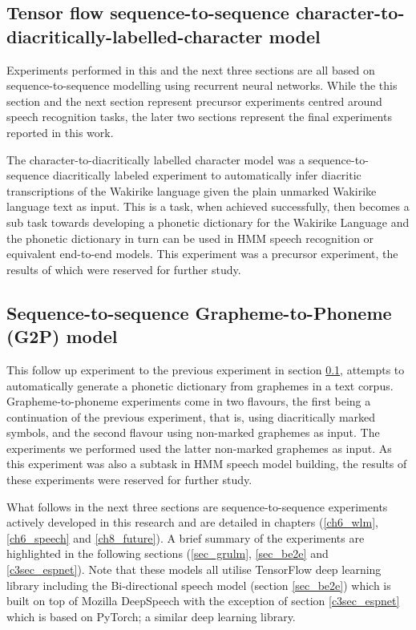 \subsection{Tensor flow sequence-to-sequence character-to-diacritically-labelled-character model}\label{sec_c2d}
Experiments performed in this and the next three sections are all based on sequence-to-sequence modelling using recurrent neural networks.  While the this section and the next section represent precursor experiments centred around speech recognition tasks, the later two sections represent the final experiments reported in this work.

The character-to-diacritically labelled character model was a sequence-to-sequence diacritically labeled experiment to automatically infer diacritic transcriptions of the Wakirike language given the plain unmarked Wakirike language text as input.  This is a task, when achieved successfully, then becomes a sub task towards developing a phonetic dictionary for the Wakirike Language and the phonetic dictionary in turn can be used in HMM speech recognition or equivalent  end-to-end models.  This experiment was a precursor experiment, the results of which were reserved for further study.

\subsection{Sequence-to-sequence Grapheme-to-Phoneme (G2P) model}\label{sec_c3_g2p}
This follow up experiment to the previous experiment in section \ref{sec_c2d},  attempts to automatically generate a phonetic dictionary from graphemes in a text corpus. Grapheme-to-phoneme experiments come in two flavours, the first being a continuation of the previous experiment, that is, using diacritically marked symbols, and the second flavour using non-marked graphemes as input.  The experiments we performed used the latter non-marked graphemes as input. As this experiment was also a subtask in HMM speech model building,  the results of these experiments were reserved for further study.

What follows in the next three sections are sequence-to-sequence experiments actively developed in this research and are detailed in chapters (\ref{ch6_wlm},\ref{ch6_speech} and \ref{ch8_future}).  A brief summary of the experiments are highlighted in the following sections (\ref{sec_grulm}, \ref{sec_be2e} and \ref{c3sec_espnet}).  Note that these models all utilise TensorFlow deep learning library including the Bi-directional speech model (section \ref{sec_be2e}) which is built on top of Mozilla DeepSpeech with the exception of section \ref{c3sec_espnet} which is based on PyTorch; a similar deep learning library.

